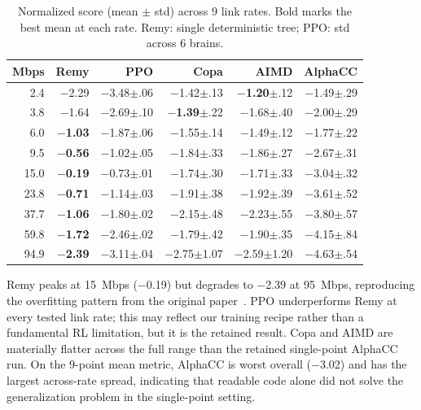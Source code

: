\begin{table}[t]
\centering
\caption{Normalized score (mean $\pm$ std) across 9 link rates. Bold marks
the best mean at each rate. Remy: single deterministic tree;
PPO: std across 6 brains.}
\label{tab:generalization}
\small
\begin{tabular}{@{}rrrrrr@{}}
\toprule
Mbps & Remy & PPO & Copa & AIMD & AlphaCC \\
\midrule
2.4  & $-$2.29 & $-$3.48{\scriptsize$\pm$.06} & $-$1.42{\scriptsize$\pm$.13} & \textbf{$-$1.20}{\scriptsize$\pm$.12} & $-$1.49{\scriptsize$\pm$.29} \\
3.8  & $-$1.64 & $-$2.69{\scriptsize$\pm$.10} & \textbf{$-$1.39}{\scriptsize$\pm$.22} & $-$1.68{\scriptsize$\pm$.40} & $-$2.00{\scriptsize$\pm$.29} \\
6.0  & \textbf{$-$1.03} & $-$1.87{\scriptsize$\pm$.06} & $-$1.55{\scriptsize$\pm$.14} & $-$1.49{\scriptsize$\pm$.12} & $-$1.77{\scriptsize$\pm$.22} \\
9.5  & \textbf{$-$0.56} & $-$1.02{\scriptsize$\pm$.05} & $-$1.84{\scriptsize$\pm$.33} & $-$1.86{\scriptsize$\pm$.27} & $-$2.67{\scriptsize$\pm$.31} \\
15.0 & \textbf{$-$0.19} & $-$0.73{\scriptsize$\pm$.01} & $-$1.74{\scriptsize$\pm$.30} & $-$1.71{\scriptsize$\pm$.33} & $-$3.04{\scriptsize$\pm$.32} \\
23.8 & \textbf{$-$0.71} & $-$1.14{\scriptsize$\pm$.03} & $-$1.91{\scriptsize$\pm$.38} & $-$1.92{\scriptsize$\pm$.39} & $-$3.61{\scriptsize$\pm$.52} \\
37.7 & \textbf{$-$1.06} & $-$1.80{\scriptsize$\pm$.02} & $-$2.15{\scriptsize$\pm$.48} & $-$2.23{\scriptsize$\pm$.55} & $-$3.80{\scriptsize$\pm$.57} \\
59.8 & \textbf{$-$1.72} & $-$2.46{\scriptsize$\pm$.02} & $-$1.79{\scriptsize$\pm$.42} & $-$1.90{\scriptsize$\pm$.35} & $-$4.15{\scriptsize$\pm$.84} \\
94.9 & \textbf{$-$2.39} & $-$3.11{\scriptsize$\pm$.04} & $-$2.75{\scriptsize$\pm$1.07} & $-$2.59{\scriptsize$\pm$1.20} & $-$4.63{\scriptsize$\pm$.54} \\
\bottomrule
\end{tabular}
\end{table}

Remy peaks at 15~Mbps ($-$0.19) but degrades to $-$2.39 at 95~Mbps,
reproducing the overfitting pattern from the original
paper~\cite{winstein2013tcp}. PPO underperforms Remy at every tested link
rate; this may reflect our training recipe rather than a fundamental RL
limitation, but it is the retained result. Copa and AIMD are materially flatter
across the full range than the retained single-point AlphaCC run. On the
9-point mean metric, AlphaCC is worst overall ($-$3.02) and has the largest
across-rate spread, indicating that readable code alone did not solve the
generalization problem in the single-point setting.

